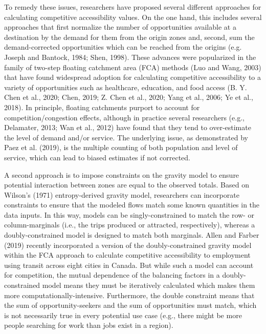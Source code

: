 \documentclass[]{elsarticle} %
\begin{document}
To remedy these issues, researchers have proposed several different
approaches for calculating competitive accessibility values. On the one
hand, this includes several approaches that first normalize the number
of opportunities available at a destination by the demand for them from
the origin zones and, second, sum the demand-corrected opportunities
which can be reached from the origins (e.g. Joseph and Bantock, 1984;
Shen, 1998). These advances were popularized in the family of two-step
floating catchment area (FCA) methods (Luo and Wang, 2003) that have
found widespread adoption for calculating competitive accessibility to a
variety of opportunities such as healthcare, education, and food access
(B. Y. Chen et al., 2020; Chen, 2019; Z. Chen et al., 2020; Yang et al.,
2006; Ye et al., 2018). In principle, floating catchments purport to
account for competition/congestion effects, although in practice several
researchers (e.g., Delamater, 2013; Wan et al., 2012) have found that
they tend to over-estimate the level of demand and/or service. The
underlying issue, as demonstrated by Paez et al. (2019), is the multiple
counting of both population and level of service, which can lead to
biased estimates if not corrected.

A second approach is to impose constraints on the gravity model to
ensure potential interaction between zones are equal to the observed
totals. Based on Wilson's (1971) entropy-derived gravity model,
researchers can incorporate constraints to ensure that the modeled flows
match some known quantities in the data inputs. In this way, models can
be singly-constrained to match the row- or column-marginals (i.e., the
trips produced or attracted, respectively), whereas a doubly-constrained
model is designed to match both marginals. Allen and Farber (2019)
recently incorporated a version of the doubly-constrained gravity model
within the FCA approach to calculate competitive accessibility to
employment using transit across eight cities in Canada. But while such a
model can account for competition, the mutual dependence of the
balancing factors in a doubly-constrained model means they must be
iteratively calculated which makes them more computationally-intensive.
Furthermore, the double constraint means that the sum of
opportunity-seekers and the sum of opportunities must match, which is
not necessarily true in every potential use case (e.g., there might be
more people searching for work than jobs exist in a region).
\end{document}
